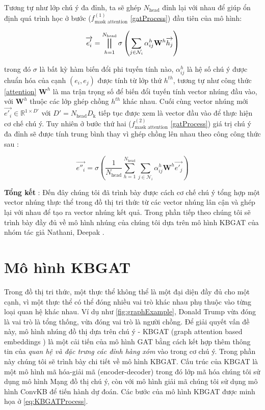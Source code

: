 Tương tự như lớp chú ý đa đỉnh, ta sẽ ghép $N_{\text{head}}$ đỉnh lại với nhau để giúp ổn định quá trình học ở bước ($f_{\text{mask attention}}^{(1)}$ \ref{gatProcess}) đầu tiên của mô hình:

\begin{equation}
	\label{multiHeadAttention}
	{\overrightarrow{e'_i}}={\bigparallel_{h=1}^{N_{\text{head}}}\sigma\left(\sum_{j\in \mathcal{N}_i}\alpha_{ij}^{h} \mathbf{W}^{h} \overrightarrow{h_{j}} \right)}
\end{equation}

trong đó $\sigma$ là bất kỳ hàm biến đổi phi tuyến tính nào, $\alpha_{ij}^h$ là hệ số chú ý được chuẩn hóa của cạnh $(e_i, e_j)$ được tính từ lớp thứ $h^{th}$, tương tự như công thức \ref{attention} $\mathbf{W}^h$ là ma trận trọng số để biến đổi tuyến tính vector nhúng đầu vào, với $\mathbf{W}^h$ thuộc các lớp ghép chồng $h^{th}$ khác nhau. Cuối cùng vector nhúng mới $\overrightarrow{e'_i} \in \mathbb{R}^{1 \times D'}$ với $D' = N_{\text{head}} D_{\text{k}}$ tiếp tục được xem là vector đầu vào để thực hiện cơ chế chú ý. Tuy nhiên ở bước thứ hai ($f_{\text{mask attention}}^{(2)}$ \ref{gatProcess}) giá trị chú ý đa đỉnh sẽ được tính trung bình thay vì ghép chồng lên nhau theo công công thức sau :

\begin{equation}
	\label{multiHeadConcat}
	{\overrightarrow{e''_i}}={\sigma\left(\frac{1}{N_{\text{head}}} \sum_{h=1}^{N_{\text{head}}}\sum_{j\in \mathcal{N}_i}\alpha_{ij}^{h} \mathbf{W}^{h} \overrightarrow{e'_{j}} \right)}
\end{equation}

\textbf{Tổng kết} : Đến đây chúng tôi đã trình bày được cách cơ chế chú ý tổng hợp một vector nhúng thực thể trong đồ thị tri thức từ các vector nhúng lân cận và ghép lại với nhau để tạo ra vector nhúng kết quả. Trong phần tiếp theo chúng tôi sẽ trình bày đầy đủ về mô hình nhúng của chúng tôi dựa trên mô hình KBGAT của nhóm tác giả Nathani, Deepak\cite{nathani2019learning} .

\section{Mô hình KBGAT}

Trong đồ thị tri thức, một thực thể không thể là một đại diện đầy đủ cho một cạnh, vì một thực thể có thể đóng nhiều vai trò khác nhau phụ thuộc vào từng loại quan hệ khác nhau. Ví dụ như \autoref{fig:graphExample}, Donald Trump vừa đóng là vai trò là tổng thống, vừa đóng vai trò là người chồng. Để giải quyết vấn đề này, mô hình nhúng đồ thị dựa trên chú ý - KBGAT (graph attention based embeddings \cite{nathani2019learning}) là một cải tiến của mô hình GAT bằng cách kết hợp thêm thông tin của \textit{quan hệ và đặc trưng các đỉnh hàng xóm} vào trong cơ chú ý. Trong phần này chúng tôi sẽ trình bày chi tiết về mô hình KBGAT. Cấu trúc của KBGAT là một mô hình mã hóa-giải mã (encoder-decoder) trong đó lớp mã hóa chúng tôi sử dụng mô hình Mạng đồ thị chú ý, còn với mô hình giải mã chúng tôi sử dụng mô hình ConvKB để tiến hành dự đoán. Các bước của mô hình KBGAT được minh họa ở \ref{eq:KBGATProcess}.

